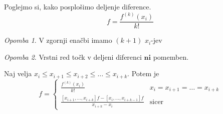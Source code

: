 \documentclass[a4paper,12pt]{article}
\theoremstyle{definition}
\theoremstyle{remark}
\newtheorem*{rem}{Opomba}
\newcounter{subsubsubsection}[subsubsection]
\begin{document}
Poglejmo si, kako posplošimo deljenje diference.
\begin{equation*}
    [x_i, x_i, \dots, x_i] f = \frac{f^{(k)}(x_i)}{k!}
\end{equation*}
\begin{rem}
    V zgornji enačbi imamo $(k+1)$ $x_i$-jev
\end{rem}

\begin{rem}
    Vrstni red točk v deljeni diferenci $\textbf{ni}$ pomemben.
\end{rem}
Naj velja $x_i \leq x_{i+1} \leq x_{i+2} \leq \dots \leq x_{i+k}$. Potem je
\begin{equation*}
    [x_i, x_{i+1}, \dots, x_{i+k}] f =
    \begin{cases}
        \frac{f^{(k)}(x_i)}{k!} & x_i = x_{i+1} = \dots = x_{i+k} \\
        \frac{[x_{i+1}, \dots, x_{i+k}] f - [x_{i}, \dots, x_{i+k-1}]f}{x_{i+k} - x_{i}} & \text{sicer}
    \end{cases}
\end{equation*}
\end{document}

